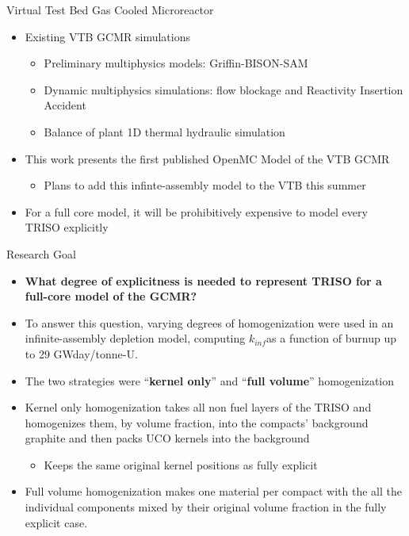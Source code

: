 \documentclass[9pt,t,aspectratio=169]{beamer}
\newcommand{\kinf}{$k_{inf}$}
\begin{document}
\begin{frame}{Virtual Test Bed Gas Cooled Microreactor}
    \begin{itemize}
        \item Existing VTB GCMR simulations
        \begin{itemize}
            \item Preliminary multiphysics models: Griffin-BISON-SAM \cite{Abdelhameed-ANS-2022,Stauff-preliminary-applications-2021,Stauff-applications-2022} 
            \item Dynamic multiphysics simulations: flow blockage and Reactivity Insertion Accident \cite{HF_MRs_ANL}
            \item Balance of plant 1D thermal hydraulic simulation \cite{Duchnowski_plant_balance_2022}
        \end{itemize}
        \item This work presents the first published OpenMC Model of the VTB GCMR
        \begin{itemize}
            \item Plans to add this infinte-assembly model to the VTB this summer
        \end{itemize}
        \item For a full core model, it will be prohibitively expensive to model every TRISO explicitly
    \end{itemize}
\end{frame}

\begin{frame}{Research Goal}
    \begin{itemize}
        \item \textbf{What degree of explicitness is needed to represent TRISO for a full-core model of the GCMR?}
        \item To answer this question, varying degrees of homogenization were used in an infinite-assembly depletion model, computing \kinf as a function of burnup up to 29 GWday/tonne-U.
        \item The two strategies were ``\textbf{kernel only}'' and ``\textbf{full volume}'' homogenization
        \item Kernel only homogenization takes all non fuel layers of the TRISO and homogenizes them, by volume fraction, into the compacts' background graphite and then packs UCO kernels into the background
        \begin{itemize}
            \item Keeps the same original kernel positions as fully explicit
        \end{itemize}
        \item Full volume homogenization makes one material per compact with the all the individual components mixed by their original volume fraction in the fully explicit case.
    \end{itemize}
\end{frame}
\end{document}
